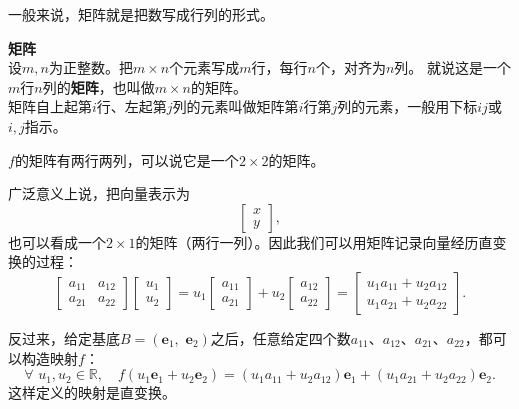 \documentclass[12pt,UTF8]{ctexbook}
\begin{document}
一般来说，矩阵就是把数写成行列的形式。
\begin{df}{\textbf{矩阵}}
    \mbox{}\\
    设$m,n$为正整数。把$m \times n$个元素写成$m$行，每行$n$个，对齐为$n$列。
    就说这是一个$m$行$n$列的\textbf{矩阵}，也叫做$m \times n$的矩阵。\\
    矩阵自上起第$i$行、左起第$j$列的元素叫做矩阵第$i$行第$j$列的元素，一般用下标$ij$或$i,j$指示。
\end{df}

$f$的矩阵有两行两列，可以说它是一个$2\times 2$的矩阵。

广泛意义上说，把向量表示为
$$ \begin{bmatrix}
    x\\ y
\end{bmatrix},$$
也可以看成一个$2\times 1$的矩阵（两行一列）。因此我们可以用矩阵记录向量经历直变换的过程：
$$ \begin{bmatrix}
    a_{11} & a_{12} \\ a_{21} & a_{22}
\end{bmatrix}\begin{bmatrix}
    u_1\\ u_2
\end{bmatrix} = u_1\begin{bmatrix}
    a_{11}\\ a_{21}
\end{bmatrix} + u_2 \begin{bmatrix}
    a_{12}\\ a_{22}
\end{bmatrix} = \begin{bmatrix}
    u_1a_{11} + u_2a_{12}\\ u_1a_{21} + u_2a_{22} 
\end{bmatrix}.$$

反过来，给定基底$B = (\mathbf{e}_1, \,\,\mathbf{e}_2)$之后，任意给定四个数$a_{11}$、$a_{12}$、$a_{21}$、$a_{22}$，都可以构造映射$f$：
$$ \forall \,\, u_1, u_2 \in \mathbb{R}, \quad  f(u_1\mathbf{e}_1 + u_2\mathbf{e}_2) = (u_1a_{11} + u_2a_{12}) \mathbf{e}_1 + (u_1a_{21} + u_2a_{22}) \mathbf{e}_2.$$
这样定义的映射是直变换。
\end{document}
